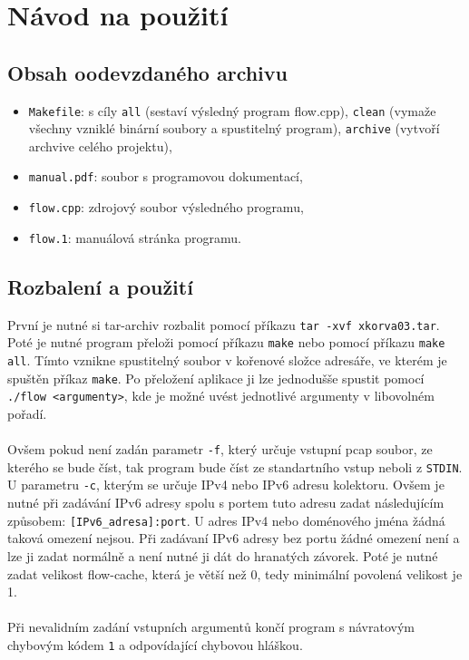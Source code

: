 \documentclass[12pt]{article}
\begin{document}
\section{Návod na použití}
\subsection{Obsah oodevzdaného archivu}
\begin{itemize}
	\item {\texttt{Makefile}: s cíly \texttt{all} (sestaví výsledný program flow.cpp), \texttt{clean} (vymaže všechny vzniklé binární soubory a spustitelný program), \texttt{archive} (vytvoří archvive celého projektu),}
	\item {\texttt{manual.pdf}: soubor s programovou dokumentací,}
	\item {\texttt{flow.cpp}: zdrojový soubor výsledného programu,}
	\item {\texttt{flow.1}: manuálová stránka programu.}
\end{itemize}
\subsection{Rozbalení a použití}
První je nutné si tar-archiv rozbalit pomocí příkazu \texttt{tar -xvf xkorva03.tar}. Poté je nutné program přeloži pomocí příkazu \texttt{make} nebo
pomocí příkazu \texttt{make all}. Tímto vznikne spustitelný soubor v kořenové složce adresáře, ve kterém je spuštěn příkaz \texttt{make}. 
Po přeložení aplikace ji lze jednodušše spustit pomocí \texttt{./flow <argumenty>}, kde je možné uvést jednotlivé argumenty v libovolném pořadí.
\\\\ 
Ovšem pokud není zadán parametr \texttt{-f}, který určuje vstupní pcap soubor, ze kterého se bude číst, tak program bude číst ze standartního vstup neboli z \texttt{STDIN}.  
U parametru \texttt{-c}, kterým se určuje IPv4 nebo IPv6 adresu kolektoru. Ovšem je nutné při zadávání IPv6 adresy spolu s portem tuto adresu zadat následujícím způsobem: \texttt{[IPv6\_adresa]:port}. U adres IPv4 nebo doménového jména žádná taková omezení nejsou.
Při zadávaní IPv6 adresy bez portu žádné omezení není a lze ji zadat normálně a není nutné ji dát do hranatých závorek. Poté je nutné zadat velikost flow-cache, která je větší než 0, tedy minimální povolená velikost je 1. 
\\\\
Při nevalidním zadání vstupních argumentů končí program s návratovým chybovým kódem \texttt{1} a odpovídající chybovou hláškou.
\end{document}
